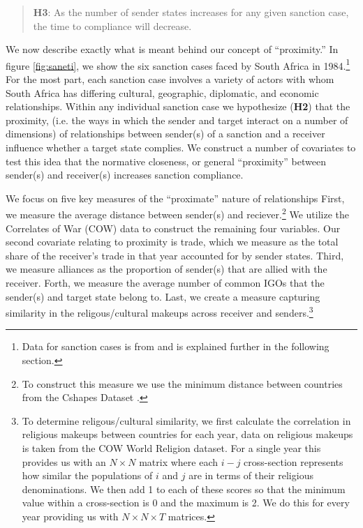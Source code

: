 \begin{quote}
	\textbf{H3}: As the number of sender states increases for any given sanction case, the time to compliance will decrease. 
\end{quote}


 We now describe exactly what is meant behind our concept of ``proximity.'' In figure \ref{fig:saneti}, we show the six sanction cases faced by South Africa in 1984.\footnote{Data for sanction cases is from \citet{morgan2009threat} and is explained further in the following section.} For the most part, each sanction case involves a variety of actors with whom South Africa has differing cultural, geographic, diplomatic, and economic relationships. Within any individual sanction case we hypothesize (\textbf{H2}) that the proximity, (i.e. the ways in which the sender and target interact on a number of dimensions) of relationships between sender(s) of a sanction and a receiver influence whether a target state complies. We construct a number of covariates to test this idea that the normative closeness, or general ``proximity'' between sender(s) and receiver(s) increases sanction compliance. 

We focus on five key measures of the ``proximate'' nature of relationships First, we measure the average distance between sender(s) and reciever.\footnote{To construct this measure we use the minimum distance between countries from the Cshapes Dataset \citep{weidmann2010geography}.} We utilize the Correlates of War (COW) data to construct the remaining four variables. Our second covariate relating to proximity is trade, which we measure as the total share of the receiver's trade in that year accounted for by sender states. Third, we measure alliances as the proportion of sender(s) that are allied with the receiver. Forth, we measure the average number of common IGOs that the sender(s) and target state belong to. Last, we create a measure capturing similarity in the religous/cultural makeups across receiver and senders.\footnote{To determine religous/cultural similarity, we first calculate the correlation in religious makeups between countries for each year, data on religious makeups is taken from the COW World Religion dataset. For a single year this provides us with an $N \times N$ matrix where each $i-j$ cross-section represents how similar the populations of $i$ and $j$ are in terms of their religious denominations. We then add 1 to each of these scores so that the minimum value within a cross-section is 0 and the maximum is 2. We do this for every year providing us with $N \times N \times T$ matrices.}

